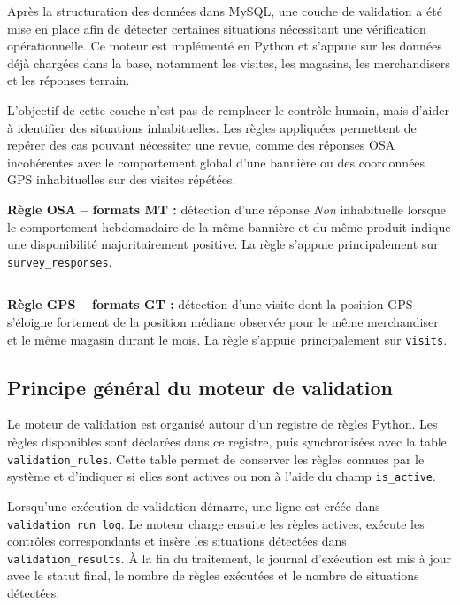 Après la structuration des données dans MySQL, une couche de validation a été mise en place afin de détecter certaines situations nécessitant une vérification opérationnelle. Ce moteur est implémenté en Python et s’appuie sur les données déjà chargées dans la base, notamment les visites, les magasins, les merchandisers et les réponses terrain.

L’objectif de cette couche n’est pas de remplacer le contrôle humain, mais d’aider à identifier des situations inhabituelles. Les règles appliquées permettent de repérer des cas pouvant nécessiter une revue, comme des réponses OSA incohérentes avec le comportement global d’une bannière ou des coordonnées GPS inhabituelles sur des visites répétées.

\begin{tcolorbox}[technicalbox,title={Synthèse des règles implémentées}]
\small
\textbf{Règle OSA -- formats MT :}
détection d’une réponse \textit{Non} inhabituelle lorsque le comportement hebdomadaire de la même bannière et du même produit indique une disponibilité majoritairement positive. La règle s’appuie principalement sur \texttt{survey\_responses}.

\vspace{0.18cm}
\hrule
\vspace{0.18cm}
\textbf{Règle GPS -- formats GT :}
détection d’une visite dont la position GPS s’éloigne fortement de la position médiane observée pour le même merchandiser et le même magasin durant le mois. La règle s’appuie principalement sur \texttt{visits}.
\end{tcolorbox}

\subsection{Principe général du moteur de validation}

Le moteur de validation est organisé autour d’un registre de règles Python. Les règles disponibles sont déclarées dans ce registre, puis synchronisées avec la table \texttt{validation\_rules}. Cette table permet de conserver les règles connues par le système et d’indiquer si elles sont actives ou non à l’aide du champ \texttt{is\_active}.

Lorsqu’une exécution de validation démarre, une ligne est créée dans \texttt{validation\_run\_log}. Le moteur charge ensuite les règles actives, exécute les contrôles correspondants et insère les situations détectées dans \texttt{validation\_results}. À la fin du traitement, le journal d’exécution est mis à jour avec le statut final, le nombre de règles exécutées et le nombre de situations détectées.

